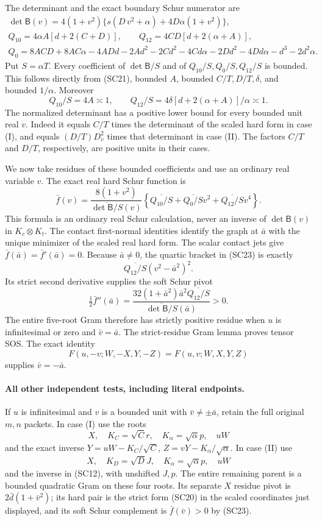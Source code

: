 The determinant and the exact boundary Schur numerator are
\[
\begin{gathered}
 \det\mathsf B(v)=4(1+v^2)\{s(D\,v^2+\alpha)+4D\alpha(1+v^2)\},\\
 Q_{10}=4\alpha A[d+2(C+D)],\qquad
 Q_{12}=4CD[d+2(\alpha+A)],\\
 Q_0=8ACD+8AC\alpha-4ADd-2Ad^2-2Cd^2-4Cd\alpha
       -2Dd^2-4Dd\alpha-d^3-2d^2\alpha.             \tag{SC21}
\end{gathered}
\]
Put $S=\alpha T$. Every coefficient of $\det\mathsf B/S$ and of
$Q_{10}/S,Q_0/S,Q_{12}/S$ is bounded. This follows directly from
(SC21), bounded $A$, bounded $C/T,D/T,\delta$, and bounded
$1/\alpha$. Moreover
\[
 Q_{10}/S=4A\asymp1,\qquad
 Q_{12}/S=4\delta[d+2(\alpha+A)]/\alpha\asymp1.       \tag{SC22}
\]
The normalized determinant has a positive lower bound for every
bounded unit real $v$. Indeed it equals $C/T$ times the determinant
of the scaled hard form in case (I), and equals
$(D/T)D_v^2$ times that determinant in case (II). The factors
$C/T$ and $D/T$, respectively, are positive units in their cases.

We now take residues of these bounded coefficients and use an
ordinary real variable $v$. The exact real hard Schur function is
\[
 \bar f(v)=
 \frac{8(1+v^2)}{\overline{\det\mathsf B/S}(v)}
 \left\{\overline{Q_{10}/S}+\overline{Q_0/S}v^2
                      +\overline{Q_{12}/S}v^4\right\}.          \tag{SC23}
\]
This formula is an ordinary real Schur calculation, never an
inverse of $\det\mathsf B(v)$ in $K_c\otimes K_t$.
The contact first-normal identities identify the graph at $\bar a$
with the unique minimizer of the scaled real hard form. The scalar
contact jets give $\bar f(\bar a)=\bar f'(\bar a)=0$.
Because $\bar a\ne0$, the quartic bracket in (SC23) is exactly
\[
 \overline{Q_{12}/S}(v^2-\bar a^2)^2.
\]
Its strict second derivative supplies the soft Schur pivot
\[
 \tfrac12\bar f''(\bar a)=
 \frac{32(1+\bar a^2)\bar a^2\overline{Q_{12}/S}}
      {\overline{\det\mathsf B/S}(\bar a)}>0.
\]
The entire five-root Gram therefore has strictly positive residue
when $u$ is infinitesimal or zero and $\bar v=\bar a$.
The strict-residue Gram lemma proves tensor SOS. The exact identity
\[
 F(u,-v;W,-X,Y,-Z)=F(u,v;W,X,Y,Z)
\]
supplies $\bar v=-\bar a$.

\paragraph{All other independent tests, including literal endpoints.}
If $u$ is infinitesimal and $v$ is a bounded unit with
$\bar v\ne\pm\bar a$, retain the full original $m,n$ packets.
In case (I) use the roots
\[
 X,\quad K_C=\sqrt C r,\quad K_\alpha=\sqrt\alpha p,\quad uW
\]
and the exact inverse
$Y=uW-K_C/\sqrt C$, $Z=vY-K_\alpha/\sqrt\alpha$.
In case (II) use
\[
 X,\quad K_D=\sqrt D J,\quad K_\alpha=\sqrt\alpha p,\quad uW
\]
and the inverse in (SC12), with unshifted $J,p$.
The entire remaining parent is a bounded quadratic Gram on these
four roots. Its separate $X$ residue pivot is
$2\bar d(1+\bar v^2)$; its hard pair is the strict form (SC20)
in the scaled coordinates just displayed, and its soft Schur
complement is $\bar f(\bar v)>0$ by (SC23).

